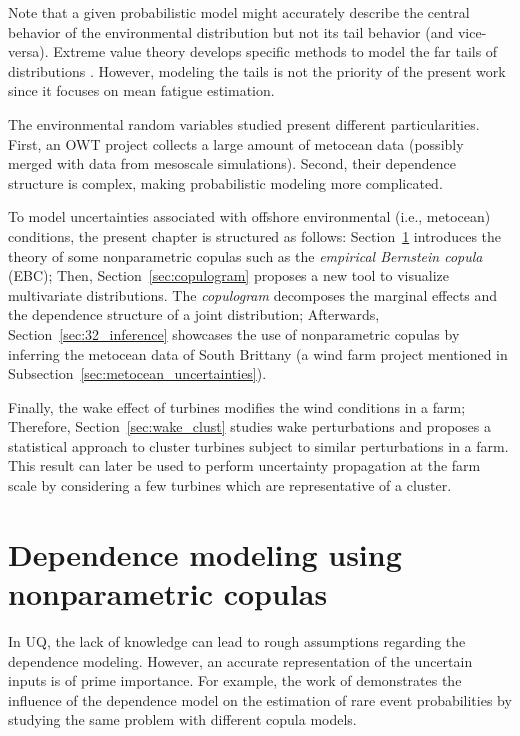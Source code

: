 Note that a given probabilistic model might accurately describe the central behavior of the environmental distribution but not its tail behavior (and vice-versa).   
Extreme value theory develops specific methods to model the far tails of distributions \citep{beirlant_2006_extreme_values}. 
However, modeling the tails is not the priority of the present work since it focuses on mean fatigue estimation.   

The environmental random variables studied present different particularities. 
First, an OWT project collects a large amount of metocean data (possibly merged with data from mesoscale simulations). 
Second, their dependence structure is complex, making probabilistic modeling more complicated. 


To model uncertainties associated with offshore environmental (i.e., metocean) conditions, the present chapter is structured as follows: 
Section~\ref{sec:nonparametric_copula} introduces the theory of some nonparametric copulas such as the \emph{empirical Bernstein copula} (EBC); 
Then, Section~\ref{sec:copulogram} proposes a new tool to visualize multivariate distributions. 
The \emph{copulogram} decomposes the marginal effects and the dependence structure of a joint distribution; 
Afterwards, Section~\ref{sec:32_inference} showcases the use of nonparametric copulas by inferring the metocean data of South Brittany (a wind farm project mentioned in Subsection~\ref{sec:metocean_uncertainties}). 

Finally, the wake effect of turbines modifies the wind conditions in a farm; 
Therefore, Section~\ref{sec:wake_clust} studies wake perturbations and proposes a statistical approach to cluster turbines subject to similar perturbations in a farm. 
This result can later be used to perform uncertainty propagation at the farm scale by considering a few turbines which are representative of a cluster. 



\section{Dependence modeling using nonparametric copulas}\label{sec:nonparametric_copula}
In UQ, the lack of knowledge can lead to rough assumptions regarding the dependence modeling. 
However, an accurate representation of the uncertain inputs is of prime importance. 
For example, the work of \citet{lebrun_2013_these,torre_2019_copula_reliability} demonstrates the influence of the dependence model on the estimation of rare event probabilities by studying the same problem with different copula models. 


